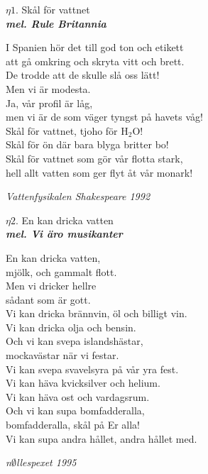 \documentclass[a6paper,10pt]{article}
\newcommand{\mel}[1]{\small\textbf{\textit{mel. #1 \\}}}
\begin{document}
\noindent
{}
\begin{center}
\Large $\eta1$. Skål för vattnet \\ 
\mel{Rule Britannia}
\end{center}
\small I Spanien hör det till god ton och etikett\\
att gå omkring och skryta vitt och brett.\\
De trodde att de skulle slå oss lätt!
\vspace{5pt}\\
Men vi är modesta.\\
Ja, vår profil är låg,\\
men vi är de som väger tyngst på havets våg!
\vspace{5pt}\\
Skål för vattnet, tjoho för H$_2$O!\\
Skål för ön där bara blyga britter bo!\\
Skål för vattnet som gör vår flotta stark,\\
hell allt vatten som ger flyt åt vår monark! 
\begin{flushright}
\textit{Vattenfysikalen Shakespeare 1992}
\end{flushright}

\setlength{\oddsidemargin}{-0.47in}
\noindent
\begin{center}
\Large $\eta2$.  En kan dricka vatten \\
\mel{Vi äro musikanter}
\end{center}
En kan dricka vatten, \\
mjölk, och gammalt flott.\\
Men vi dricker hellre\\
sådant som är gott.
\vspace{5pt}\\
Vi kan dricka brännvin, öl och billigt vin.\\
Vi kan dricka olja och bensin.
\vspace{5pt}\\
Och vi kan svepa islandshästar,\\
mockavästar när vi festar.\\
Vi kan svepa svavelsyra på vår yra fest.
\vspace{5pt}\\
Vi kan häva kvicksilver och helium.\\
Vi kan häva ost och vardagsrum.
\vspace{5pt}\\
Och vi kan supa bomfadderalla,\\
bomfadderalla, skål på Er alla!\\
Vi kan supa andra hållet, andra hållet med. 
\begin{flushright}
\textit{n$\emptyset$llespexet 1995}
\end{flushright}
\end{document}

